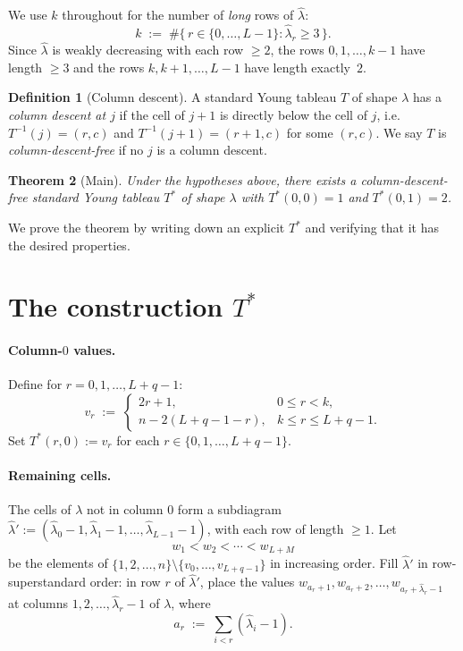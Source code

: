 \documentclass[11pt]{article}
\newtheorem{theorem}{Theorem}
\theoremstyle{definition}
\newtheorem{definition}[theorem]{Definition}
\newcommand{\hatl}{\widehat\lambda}
\begin{document}
We use $k$ throughout for the number of \emph{long} rows of $\hatl$:
\[
   k \;:=\; \#\{\, r \in \{0,\ldots,L-1\} : \hatl_r \ge 3 \,\}.
\]
Since $\hatl$ is weakly decreasing with each row $\ge 2$, the rows
$0, 1, \ldots, k-1$ have length $\ge 3$ and the rows $k, k+1, \ldots,
L-1$ have length exactly~$2$.

\begin{definition}[Column descent]\label{def:col-descent}
A standard Young tableau $T$ of shape $\lambda$ has a \emph{column
descent at $j$} if the cell of $j+1$ is directly below the cell of
$j$, i.e.\ $T^{-1}(j) = (r,c)$ and $T^{-1}(j+1) = (r+1, c)$ for some
$(r,c)$.  We say $T$ is \emph{column-descent-free} if no $j$ is a
column descent.
\end{definition}

\begin{theorem}[Main]\label{thm:main}
Under the hypotheses above, there exists a column-descent-free standard
Young tableau $T^*$ of shape $\lambda$ with $T^*(0,0) = 1$ and
$T^*(0,1) = 2$.
\end{theorem}

We prove the theorem by writing down an explicit $T^*$ and verifying
that it has the desired properties.

\section{The construction $T^*$}\label{sec:construction}

\paragraph{Column-$0$ values.}  Define for $r = 0, 1, \ldots, L+q-1$:
\begin{equation}\label{eq:vr}
  v_r \;:=\;
  \begin{cases}
     2r+1, & 0 \le r < k,\\
     n - 2(L+q-1-r), & k \le r \le L+q-1.
  \end{cases}
\end{equation}
Set $T^*(r, 0) := v_r$ for each $r \in \{0, 1, \ldots, L+q-1\}$.

\paragraph{Remaining cells.}  The cells of $\lambda$ not in column $0$
form a subdiagram $\hatl' := (\hatl_0 - 1, \hatl_1 - 1, \ldots,
\hatl_{L-1} - 1)$, with each row of length $\ge 1$.  Let
\[
   w_1 < w_2 < \cdots < w_{L+M}
\]
be the elements of $\{1, 2, \ldots, n\} \setminus \{v_0, \ldots,
v_{L+q-1}\}$ in increasing order.  Fill $\hatl'$ in row-superstandard
order: in row $r$ of $\hatl'$, place the values
$w_{a_r + 1}, w_{a_r + 2}, \ldots, w_{a_r + \hatl_r - 1}$ at columns
$1, 2, \ldots, \hatl_r - 1$ of $\lambda$, where
\[
   a_r \;:=\; \sum_{i < r} (\hatl_i - 1).
\]
\end{document}
